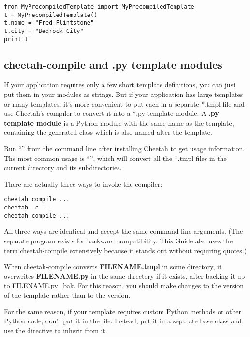 \begin{verbatim}
from MyPrecompiledTemplate import MyPrecompiledTemplate
t = MyPrecompiledTemplate()
t.name = "Fred Flintstone"
t.city = "Bedrock City"
print t
\end{verbatim}

\subsection{cheetah-compile and .py template modules}
\label{howWorks.cheetah-compile}


If your application requires only a few short template definitions, you can
just put them in your modules as strings.  But if your application has large
templates or many templates, it's more convenient to put each in a separate
*.tmpl file and use Cheetah's compiler to convert it into a *.py template
module.  A {\bf .py template module} is a Python module with the same name as
the template, containing the generated class which is also named after the
template.  

Run ``'' from the command line after installing
Cheetah to get usage information.  The most common usage is
``'', which will convert all the *.tmpl files in the
current directory and its subdirectories.


There are actually three ways to invoke the compiler:
\begin{verbatim}
cheetah compile ...
cheetah -c ...
cheetah-compile ...
\end{verbatim}
All three ways are identical and accept the same command-line arguments.
(The separate program  exists for backward compatibility.
This Guide also uses the term cheetah-compile extensively because it stands out
without requiring quotes.)

When cheetah-compile converts {\bf FILENAME.tmpl} in some directory, it
overwrites {\bf FILENAME.py} in the same directory if it exists, after backing
it up to FILENAME.py\_bak.  For this reason, you should make changes to the
 version of the template rather than to the  version.

For the same reason, if your template requires custom Python methods or
other Python code, don't put it in the  file.  Instead, put
it in a separate base class and use the  directive to
inherit from it.

